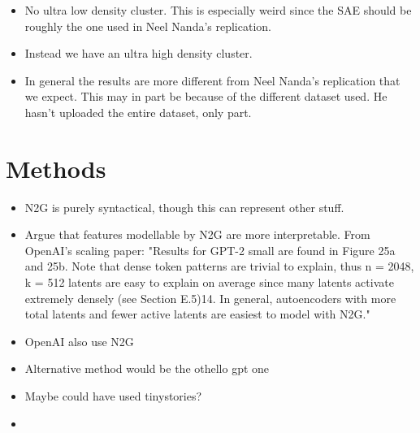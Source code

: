 \begin{itemize}
    \item No ultra low density cluster. This is especially weird since the SAE should be roughly the one used in Neel Nanda's replication.
    \item Instead we have an ultra high density cluster.
    \item In general the results are more different from Neel Nanda's replication that we expect. This may in part be because of the different dataset used. He hasn't uploaded the entire dataset, only part.
\end{itemize}

\section{Methods}

\begin{itemize}
    \item N2G is purely syntactical, though this can represent other stuff.
    \item Argue that features modellable by N2G are more interpretable. From OpenAI's scaling paper: "Results for GPT-2 small are found in Figure 25a and 25b. Note that dense token patterns are trivial to
    explain, thus n = 2048, k = 512 latents are easy to explain on average since many latents activate
    extremely densely (see Section E.5)14. In general, autoencoders with more total latents and fewer
    active latents are easiest to model with N2G."
    \item OpenAI also use N2G
    \item Alternative method would be the othello gpt one
    \item Maybe could have used tinystories?
    \item 
\end{itemize}